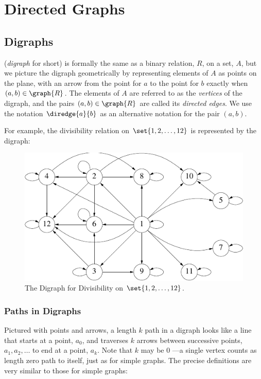 \chapter{Directed Graphs}

\section{Digraphs} 

 (\emph{digraph} for
short) is formally the same as a binary relation, $R$, on a set, $A$, but
we picture the digraph geometrically by representing elements of $A$ as
points on the plane, with an arrow from the point for $a$ to the point for
$b$ exactly when $(a,b) \in \graph{R}$.  The elements of $A$ are referred
to as the \emph{vertices} of the digraph, and the pairs $(a,b) \in
\graph{R}$ are called its \emph{directed edges}.  We use the notation
$\diredge{a}{b}$ as an alternative notation for the pair $(a,b)$.

For example, the divisibility relation on $\set{1,2,\dots,12}$ is
represented by the digraph:
\begin{figure}[h]
\centering \includegraphics{figures/divisibility.pdf}
\caption{The Digraph for Divisibility on $\set{1,2,\dots,12}$.}
\label{fig:divisibility-digraph}
\end{figure}


\subsection{Paths in Digraphs}\label{paths}

Pictured with points and arrows, a length $k$ path in a digraph looks like
a line that starts at a point, $a_0$, and traverses $k$ arrows between
successive points, $a_1,a_2,\dots$ to end at a point, $a_k$.  Note that
$k$ may be 0 ---a single vertex counts as length zero path to itself, just
as for simple graphs.  The precise definitions are very similar to those
for simple graphs:

